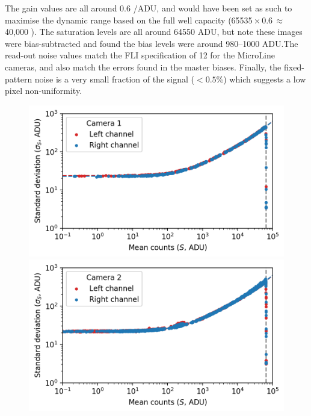 \begin{colsection}
\begin{colsection}
The gain values are all around 0.6 \elec/ADU, and would have been set as such to maximise the dynamic range based on the full well capacity (65535\,$\times$\,0.6\,$\approx$\,40,000 \elec). The saturation levels are all around 64550 ADU, but note these images were bias-subtracted and  found the bias levels were around 980--1000 ADU.\@ The read-out noise values match the FLI specification of 12 \elec{} for the MicroLine cameras, and also match the errors found in the master biases. Finally, the fixed-pattern noise is a very small fraction of the signal ($<0.5\%$) which suggests a low pixel non-uniformity.

\newpage

\begin{figure}[p]
    \begin{center}
        \begin{minipage}[t]{0.49\textwidth}\vspace{10pt}
            \includegraphics[width=\linewidth]{images/detectors/ptc_1.png}
        \end{minipage}
        \begin{minipage}[t]{0.49\textwidth}\vspace{10pt}
            \includegraphics[width=\linewidth]{images/detectors/ptc_2.png}
        \end{minipage}


\end{center}
\end{figure}
\end{colsection}
\end{colsection}
